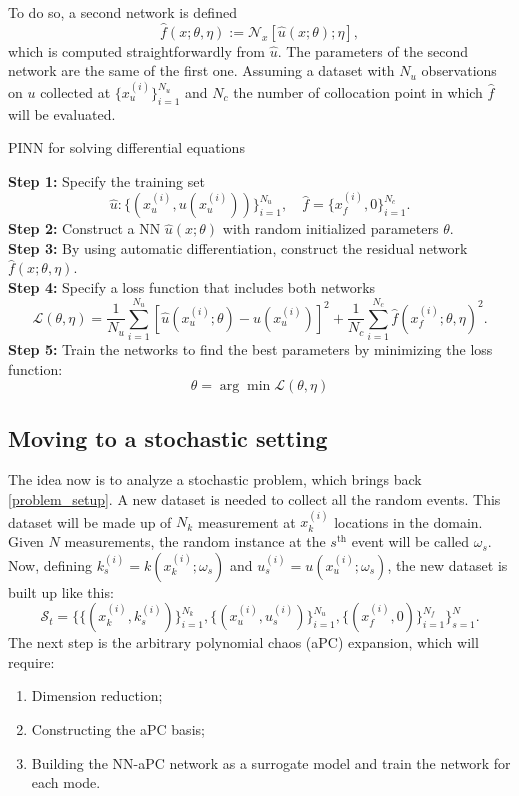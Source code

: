 \documentclass[11pt,a4paper]{article}
\begin{document}
To do so, a second network is defined 
\begin{equation}
    \hat{f}(x;\theta,\eta) := \mathcal{N}_x\left[ \hat{u}(x;\theta);\eta \right],
    \label{second_network}
\end{equation}
which is computed straightforwardly from \(\hat{u}\). The parameters of the second network are the same of the first one. 
Assuming a dataset with \(N_u\) observations on \(u\) collected at \(\{ x^{(i)}_u \}^{N_u}_{i=1}\) and \(N_c\) the number of collocation point in which \(\hat{f}\) will be evaluated.
\begin{algorithm}[H]
\caption{PINN for solving differential equations}\label{alg:cap}
\textbf{Step 1:} Specify the training set 
\[
    \hat{u}: \{ (x^{(i)}_u, u(x^{(i)}_u))\}^{N_u}_{i=1}, \quad \hat{f} = \{x^{(i)}_f, 0\}^{N_c}_{i=1}.
\]
\textbf{Step 2:} Construct a NN \(\hat{u}(x;\theta)\) with random initialized parameters \(\theta\). \\
\textbf{Step 3:} By using automatic differentiation, construct the residual network \(\hat{f}(x;\theta, \eta)\). \\
\textbf{Step 4:} Specify a loss function that includes both networks 
\begin{equation}
    \label{loss_fn}
    \mathcal{L}(\theta, \eta) = \frac{1}{N_u} \sum_{i=1}^{N_u} [\hat{u}(x^{(i)}_u; \theta) - u(x^{(i)}_u)]^2+ \frac{1}{N_c} \sum_{i=1}^{N_c}\hat{f}(x_f^{(i)};\theta, \eta)^2.
\end{equation}
\textbf{Step 5:} Train the networks to find the best parameters by minimizing the loss function:
\[
    \theta = \arg \min \mathcal{L}(\theta,\eta)
\]
\end{algorithm}
\subsection{Moving to a stochastic setting}
The idea now is to analyze a stochastic problem, which brings back \eqref{problem_setup}. A new dataset is needed to collect all the random events. This dataset will be made up of \(N_k\) measurement at \(x^{(i)}_k\) locations in the domain. Given \(N\) measurements, the random instance at the \(s^{\text{th}}\) event will be called \(\omega_s\). Now, defining \(k_s^{(i)} = k(x_k^{(i)}; \omega_s)\) and \(u_s^{(i)} = u(x_u^{(i)};\omega_s)\), the new dataset is built up like this:
\[
    \mathcal{S}_t = \{\{(x^{(i)}_k, k^{(i)}_s)\}^{N_k}_{i=1},\{(x^{(i)}_u, u^{(i)}_s)\}^{N_u}_{i=1},\{(x^{(i)}_f,0)\}^{N_f}_{i=1}\}^{N}_{s=1}.
\]    
The next step is the arbitrary polynomial chaos (aPC) expansion, which will require:
\begin{enumerate}
    \item Dimension reduction;
    \item Constructing the aPC basis;
    \item Building the NN-aPC network as a surrogate model and train the network for each mode.
\end{enumerate}
\end{document}
